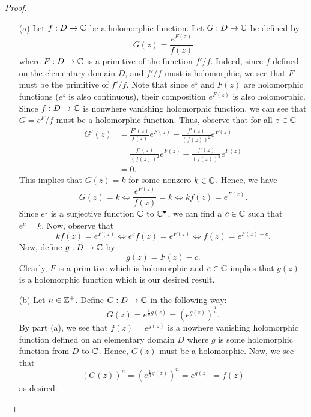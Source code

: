 \documentclass[a4paper]{article}
\begin{document}
\begin{proof}
\begin{enumerate}
    \item[(a)] Let \( f: D \to \mathbb{C}  \) be a holomorphic function. Let \( G: D \to \mathbb{C}   \) be defined by
        \[  G(z) =  \frac{ e^{F(z)} }{ f(z) }  \]
        where \( F: D \to \mathbb{C}  \) is a primitive of the function \( f' / f  \). Indeed, since \( f  \) defined on the elementary domain \( D  \), and \( f' / f  \) must is holomorphic, we see that \( F  \) must be the primitive of \( f' / f \). Note that since \( e^{z} \) and \( F(z) \) are holomorphic functions (\( e^{z} \) is also continuous), their composition \( e^{F(z)} \) is also holomorphic. Since \( f: D \to \mathbb{C}  \) is nonwhere vanishing holomorphic function, we can see that \( G =  e^{F} / f  \) must be a holomorphic function. Thus, observe that for all \( z \in \mathbb{C}  \)
        \begin{align*}
            G'(z) &= \frac{ F'(z) }{ f(z)  } e^{F(z)} - \frac{ f'(z)  }{  (f(z))^{2} } e^{F(z)} \\
                  &= \frac{ f'(z)  }{  (f(z))^{2} }  e^{F(z)} - \frac{ f'(z)  }{ (f(z))^{2} }  e^{F(z)} \\
                  &= 0. 
        \end{align*}
        This implies that \( G(z) = k  \) for some nonzero \( k \in \mathbb{C}  \). Hence, we have
        \[  G(z) = k  \iff \frac{ e^{F(z)} }{ f(z) }  = k \iff kf(z) = e^{F(z)}. \]
        Since \( e^{z} \) is a surjective function \( \mathbb{C}  \) to \( \mathbb{C}^{\bullet} \), we can find a \( c \in \mathbb{C}  \) such that \( e^{c} = k  \). Now, observe that 
        \[  k f(z) = e^{F(z)} \iff e^{c} f(z) = e^{F(z)} \iff f(z) = e^{F(z) - c}. \]
        Now, define \( g: D \to \mathbb{C}   \) by 
        \[  g(z) = F(z) - c. \]
        Clearly, \( F  \) is a primitive which is holomorphic and \( c \in \mathbb{C}   \) implies that \( g(z) \) is a holomorphic function which is our desired result.

    \item[(b)] Let \( n \in \mathbb{Z}^{+} \). Define \( G: D \to \mathbb{C}  \) in the following way:
        \[  G(z) = e^{\frac{ 1 }{ n } g(z)} = ( e^{g(z)} )^{\frac{ 1 }{ n } }. \]
        By part (a), we see that \( f(z) = e^{g(z)} \) is a nowhere vanishing holomorphic function defined on an elementary domain \( D  \) where \( g  \) is some holomorphic function from \( D  \) to \( \mathbb{C}  \). Hence, \( G(z) \) must be a holomorphic. Now, we see that  
        \[  (G(z))^{n} = (e^{\frac{ 1 }{ n } g(z)})^{n} = e^{g(z)} = f(z) \]
        as desired.
    \end{enumerate}
\end{proof}
\end{document}
